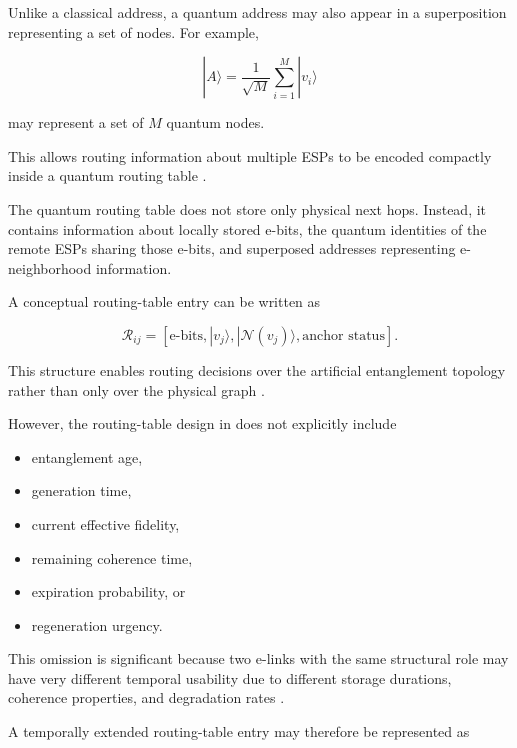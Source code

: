 Unlike a classical address, a quantum address may also appear in a superposition representing a set of nodes. For example,

\begin{equation}
    |A\rangle
    =
    \frac{1}{\sqrt{M}}
    \sum_{i=1}^{M}
    |v_i\rangle
\end{equation}

may represent a set of $M$ quantum nodes.

This allows routing information about multiple ESPs to be encoded compactly inside a quantum routing table \cite{caleffi2025quantumarchitecture}.

The quantum routing table does not store only physical next hops. Instead, it contains information about locally stored e-bits, the quantum identities of the remote ESPs sharing those e-bits, and superposed addresses representing e-neighborhood information.

A conceptual routing-table entry can be written as

\begin{equation}
    \mathcal{R}_{ij}
    =
    \left[
    \text{e-bits},
    |v_j\rangle,
    |\mathcal{N}(v_j)\rangle,
    \text{anchor status}
    \right].
\end{equation}

This structure enables routing decisions over the artificial entanglement topology rather than only over the physical graph \cite{caleffi2025quantumarchitecture}.

However, the routing-table design in \cite{caleffi2025quantumarchitecture} does not explicitly include

\begin{itemize}
    \item entanglement age,
    \item generation time,
    \item current effective fidelity,
    \item remaining coherence time,
    \item expiration probability, or
    \item regeneration urgency.
\end{itemize}

This omission is significant because two e-links with the same structural role may have very different temporal usability due to different storage durations, coherence properties, and degradation rates \cite{ercetin2026fidelityage,ceran2026age}.

A temporally extended routing-table entry may therefore be represented as

